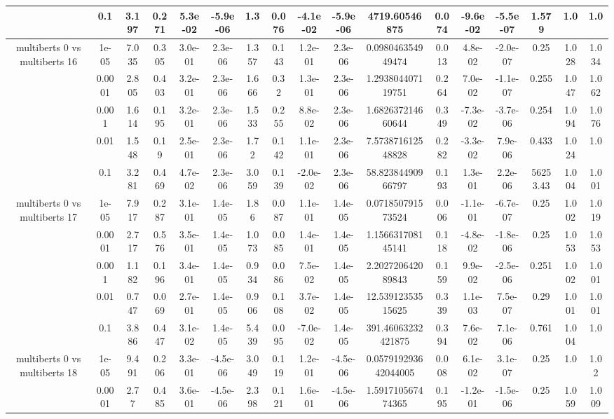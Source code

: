 \begin{tabular}{|c|c|c|c|c|c|c|c|c|c|c|c|c|c|c|c|c|}
 & 0.1 & 3.197 & 0.271 & 5.3e-02 & -5.9e-06 & 1.3 & 0.076 & -4.1e-02 & -5.9e-06 & 4719.60546875 & 0.074 & -9.6e-02 & -5.5e-07 & 1.579 & 1.0 & 1.0 \\
\hline
\multirow{5}{*}{multiberts 0 vs multiberts 16} & 1e-05 & 7.035 & 0.305 & 3.0e-01 & 2.3e-06 & 1.357 & 0.143 & 1.2e-01 & 2.3e-06 & 0.098046354949474 & 0.013 & 4.8e-02 & -2.0e-07 & 0.25 & 1.028 & 1.034 \\
 & 0.0001 & 2.805 & 0.403 & 3.2e-01 & 2.3e-06 & 1.666 & 0.32 & 1.3e-01 & 2.3e-06 & 1.293804407119751 & 0.264 & 7.0e-02 & -1.1e-07 & 0.255 & 1.047 & 1.062 \\
 & 0.001 & 1.614 & 0.195 & 3.2e-01 & 2.3e-06 & 1.533 & 0.255 & 8.8e-02 & 2.3e-06 & 1.682637214660644 & 0.349 & -7.3e-02 & -3.7e-06 & 0.254 & 1.094 & 1.076 \\
 & 0.01 & 1.548 & 0.19 & 2.5e-01 & 2.3e-06 & 1.72 & 0.142 & 1.1e-01 & 2.3e-06 & 7.573871612548828 & 0.282 & -3.3e-02 & 7.9e-06 & 0.433 & 1.024 & 1.0 \\
 & 0.1 & 3.281 & 0.469 & 4.7e-02 & 2.3e-06 & 3.059 & 0.139 & -2.0e-02 & 2.3e-06 & 58.82384490966797 & 0.193 & 1.3e-01 & 2.2e-06 & 56253.43 & 1.004 & 1.001 \\
\hline
\multirow{5}{*}{multiberts 0 vs multiberts 17} & 1e-05 & 7.917 & 0.287 & 3.1e-01 & 1.4e-05 & 1.86 & 0.087 & 1.1e-01 & 1.4e-05 & 0.071850791573524 & 0.006 & -1.1e-01 & -6.7e-07 & 0.25 & 1.002 & 1.019 \\
 & 0.0001 & 2.717 & 0.576 & 3.5e-01 & 1.4e-05 & 1.073 & 0.085 & 1.4e-01 & 1.4e-05 & 1.156631708145141 & 0.118 & -4.8e-02 & -1.8e-06 & 0.25 & 1.053 & 1.053 \\
 & 0.001 & 1.182 & 0.196 & 3.4e-01 & 1.4e-05 & 0.934 & 0.086 & 7.5e-02 & 1.4e-05 & 2.202720642089843 & 0.159 & 9.9e-02 & -2.5e-06 & 0.251 & 1.002 & 1.001 \\
 & 0.01 & 0.747 & 0.069 & 2.7e-01 & 1.4e-05 & 0.906 & 0.108 & 3.7e-02 & 1.4e-05 & 12.53912353515625 & 0.339 & 1.1e-03 & 7.5e-07 & 0.29 & 1.001 & 1.001 \\
 & 0.1 & 3.886 & 0.447 & 3.1e-02 & 1.4e-05 & 5.439 & 0.095 & -7.0e-02 & 1.4e-05 & 391.46063232421875 & 0.394 & 7.6e-02 & 7.1e-06 & 0.761 & 1.004 & 1.0 \\
\hline
\multirow{5}{*}{multiberts 0 vs multiberts 18} & 1e-05 & 9.491 & 0.206 & 3.3e-01 & -4.5e-06 & 3.049 & 0.119 & 1.2e-01 & -4.5e-06 & 0.057919293642044005 & 0.008 & 6.1e-02 & 3.1e-07 & 0.25 & 1.0 & 1.02 \\
 & 0.0001 & 2.77 & 0.485 & 3.6e-01 & -4.5e-06 & 2.398 & 0.121 & 1.6e-01 & -4.5e-06 & 1.591710567474365 & 0.195 & -1.2e-01 & -1.5e-06 & 0.25 & 1.059 & 1.009 \\

\end{tabular}
